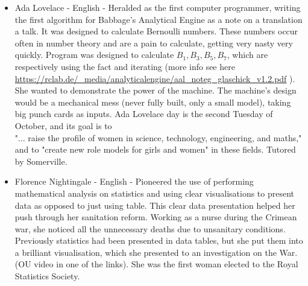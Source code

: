 \documentclass{article}
\begin{document}
\begin{itemize}
    
    \item Ada Lovelace - English - Heralded as the first computer programmer, writing the first algorithm for Babbage's Analytical Engine as a note on a translation a talk. It was designed to calculate Bernoulli numbers. These numbers occur often in number theory and are a pain to calculate, getting very nasty very quickly. Program was designed to calculate $B_1, B_3, B_5, B_7$, which are respectively
    using the fact
    and iterating (more info see here \url{https://rclab.de/_media/analyticalengine/aal_noteg_glaschick_v1.2.pdf} ). She wanted to demonstrate the power of the machine.
    The machine's design would be a mechanical mess (never fully built, only a small model), taking big punch cards as inputs. Ada Lovelace day is the second Tuesday of October, and its goal is to \\
    \newline
    "... raise the profile of women in science, technology, engineering, and maths," and to "create new role models for girls and women" in these fields.
    \newline
    Tutored by Somerville. 

    
    \item Florence Nightingale - English - Pioneered the use of performing mathematical analysis on statistics and using clear visualisations to present data as opposed to just using table. This clear data presentation helped her push through her sanitation reform. Working as a nurse during the Crimean war, she noticed all the unnecessary deaths due to unsanitary conditions. Previously statistics had been presented in data tables, but she put them into a brilliant visualisation, which she presented to an investigation on the War. (OU video in one of the links). She was the first woman elected to the Royal Statistics Society. 
    

\end{itemize}
\end{document}
